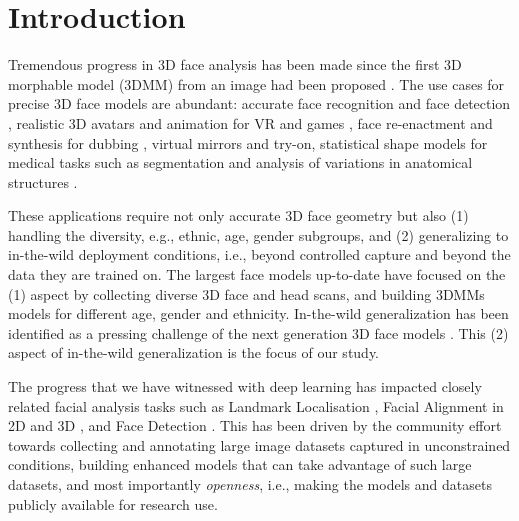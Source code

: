 \documentclass[10pt,twocolumn,letterpaper]{article}
\begin{document}
\section{Introduction}
\label{sec:intro}
Tremendous progress in 3D face analysis has been made since the first 3D morphable model (3DMM) \cite{3dmm} from an image had been proposed \cite{3dmm_survey}. 
The use cases for precise 3D face models are abundant: accurate face recognition and face detection \cite{FacePoseNet}, realistic 3D avatars and animation for VR and games \cite{LipSync3D}, face re-enactment and synthesis for dubbing \cite{NeuralVoicePuppetry}, virtual mirrors and try-on, statistical shape models for medical tasks such as segmentation and analysis of variations in anatomical structures \cite{zheng2017statistical}. 

These applications require not only accurate 3D face geometry but also (1) handling the diversity, e.g., ethnic, age, gender subgroups, and (2) generalizing to in-the-wild deployment conditions, i.e., beyond controlled capture and beyond the data they are trained on.  
The largest face models up-to-date \cite{Ploumpis_2019_CVPR, 7780967} have focused on the (1) aspect by collecting diverse 3D face and head scans, and building 3DMMs models for different age, gender and ethnicity. 
In-the-wild generalization has been identified as a pressing challenge of the next generation 3D face models \cite{3dmm_survey}. 
This (2) aspect of in-the-wild generalization is the focus of our study. 

The progress that we have witnessed with deep learning has impacted closely related facial analysis tasks such as Landmark Localisation \cite{Sun_2013_CVPR, HyperFace, sagonas2013300, BurgosArtizzu2013RobustFL, RetinaFace}, Facial Alignment in 2D and 3D \cite{DBLP:journals/corr/ZhangZL016, 10.1007/978-3-319-10599-4_8, img2pose, DAMDNet, bulat_how_far, 3DFAW, SADRNet, bulat_binarized, NME_bbox2, wayne2018lab}, and Face Detection \cite{HyperFace, DBLP:journals/corr/ZhangZL016, 10.1007/978-3-319-10599-4_8, img2pose, occlusion_coherence, RetinaFace}. 
This has been driven by the community effort towards collecting and annotating large image datasets captured in unconstrained conditions, building enhanced models that can take advantage of such large datasets, and most importantly \emph{openness}, i.e., making the models and datasets publicly available for research use. 
\end{document}
